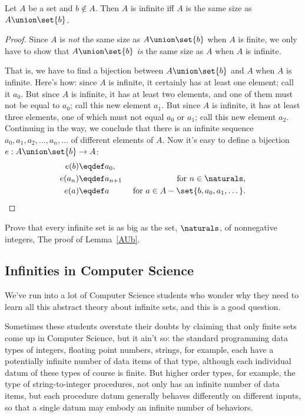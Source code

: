 \begin{lemma}\label{AUb}
  Let $A$ be a set and $b \notin A$.  Then $A$ is infinite iff $A$ is the
  same size as $A \union \set{b}$.
\end{lemma}
\begin{proof}
  Since $A$ is \emph{not} the same size as $A \union \set{b}$ when $A$ is
  finite, we only have to show that $A \union \set{b}$ \emph{is} the same
  size as $A$ when $A$ is infinite.

That is, we have to find a bijection between $A \union \set{b}$ and $A$
when $A$ is infinite.  Here's how: since $A$ is infinite, it certainly has
at least one element; call it $a_0$.  But since $A$ is infinite, it has at
least two elements, and one of them must not be equal to $a_0$; call this
new element $a_1$.  But since $A$ is infinite, it has at least three
elements, one of which must not equal $a_0$ or $a_1$; call this new
element $a_2$.  Continuing in the way, we conclude that there is an
infinite sequence $a_0,a_1,a_2,\dots,a_n,\dots$ of different elements of
$A$.  Now it's easy to define a bijection $e: A \union \set{b} \to A$:
\begin{align*}
e(b) & \eqdef a_0,\\
e(a_n) & \eqdef a_{n+1}  &\text{ for } n \in \naturals,\\
e(a) & \eqdef a & \text{ for } a \in A - \set{b,a_0,a_1,\dots}.
\end{align*}
\end{proof}

\begin{notesproblem}{}
Prove that every infinite set is as big as the set, $\naturals$, of
nonnegative integers,
\hint The proof of Lemma~\ref{AUb}.
\end{notesproblem}

\subsection{Infinities in Computer Science}

We've run into a lot of Computer Science students who wonder why they need
to learn all this abstract theory about infinite sets, and this is a good
question.

Sometimes these students overstate their doubts by claiming that only
finite sets come up in Computer Science, but it ain't so: the standard
programming data types of integers, floating point numbers, strings, for
example, each have a potentially infinite number of data items of that
type, although each individual datum of these types of course is finite.
But higher order types, for example, the type of string-to-integer
procedures, not only has an infinite number of data items, but each
procedure datum generally behaves differently on different inputs, so that
a single datum may embody an infinite number of behaviors.

\endinput
